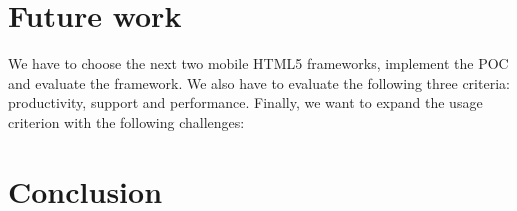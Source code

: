 \documentclass[a4paper]{artikel3}
\begin{document}
\section{Future work} %
\label{sec:future_work}
We have to choose the next two mobile HTML5 frameworks, implement the POC and evaluate the framework.
We also have to evaluate the following three criteria: productivity, support and performance. 
Finally, we want to expand the usage criterion with the following challenges:



\section{Conclusion} %
\label{sec:conclusion}




%


\end{document}
